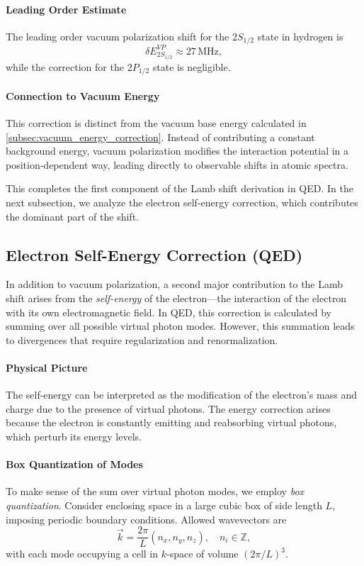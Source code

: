 \documentclass[12pt]{article}
\begin{document}
\paragraph{Leading Order Estimate}
The leading order vacuum polarization shift for the \(2S_{1/2}\) state in hydrogen is
\[
\delta E_{2S_{1/2}}^{VP} \approx 27\,\mathrm{MHz},
\]
while the correction for the \(2P_{1/2}\) state is negligible.

\paragraph{Connection to Vacuum Energy}
This correction is distinct from the vacuum base energy calculated in \ref{subsec:vacuum_energy_correction}. Instead of contributing a constant background energy, vacuum polarization modifies the interaction potential in a position-dependent way, leading directly to observable shifts in atomic spectra.

This completes the first component of the Lamb shift derivation in QED. In the next subsection, we analyze the electron self-energy correction, which contributes the dominant part of the shift.

\subsection{Electron Self-Energy Correction (QED)}\label{subsection:qed_self_energy}

In addition to vacuum polarization, a second major contribution to the Lamb shift arises from the \emph{self-energy} of the electron—the interaction of the electron with its own electromagnetic field. In QED, this correction is calculated by summing over all possible virtual photon modes. However, this summation leads to divergences that require regularization and renormalization.

\paragraph{Physical Picture}
The self-energy can be interpreted as the modification of the electron’s mass and charge due to the presence of virtual photons. The energy correction arises because the electron is constantly emitting and reabsorbing virtual photons, which perturb its energy levels.

\paragraph{Box Quantization of Modes}
To make sense of the sum over virtual photon modes, we employ \emph{box quantization}. Consider enclosing space in a large cubic box of side length \(L\), imposing periodic boundary conditions. Allowed wavevectors are
\[
\vec{k} = \frac{2\pi}{L}(n_x, n_y, n_z), \quad n_i \in \mathbb{Z},
\]
with each mode occupying a cell in \(k\)-space of volume \((2\pi/L)^3\).
\end{document}
